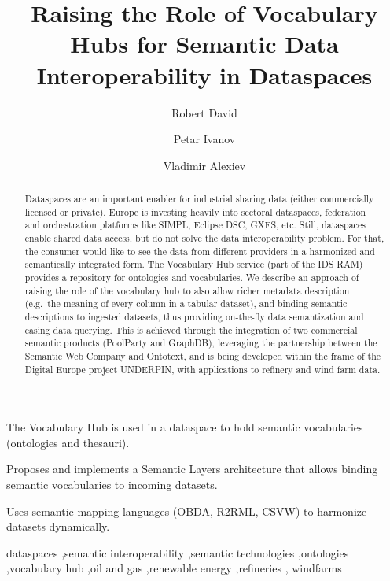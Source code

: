 \documentclass[
  super,
  preprint,
  3p]{elsarticle}
\begin{document}
\begin{frontmatter}
\title{Raising the Role of Vocabulary Hubs for Semantic Data
Interoperability in Dataspaces}
\author[1]{Robert David%
%
}
\author[2]{Petar Ivanov%
%
}
\author[2]{Vladimir Alexiev%
%
}





        
\begin{abstract}
Dataspaces are an important enabler for industrial sharing data (either
commercially licensed or private). Europe is investing heavily into
sectoral dataspaces, federation and orchestration platforms like SIMPL,
Eclipse DSC, GXFS, etc. Still, dataspaces enable shared data access, but
do not solve the data interoperability problem. For that, the consumer
would like to see the data from different providers in a harmonized and
semantically integrated form. The Vocabulary Hub service (part of the
IDS RAM) provides a repository for ontologies and vocabularies. We
describe an approach of raising the role of the vocabulary hub to also
allow richer metadata description (e.g.~the meaning of every column in a
tabular dataset), and binding semantic descriptions to ingested
datasets, thus providing on-the-fly data semantization and easing data
querying. This is achieved through the integration of two commercial
semantic products (PoolParty and GraphDB), leveraging the partnership
between the Semantic Web Company and Ontotext, and is being developed
within the frame of the Digital Europe project UNDERPIN, with
applications to refinery and wind farm data.
\end{abstract}



\begin{highlights}
\item The Vocabulary Hub is used in a dataspace to hold semantic
vocabularies (ontologies and thesauri).\item Proposes and implements a
Semantic Layers architecture that allows binding semantic vocabularies
to incoming datasets.\item Uses semantic mapping languages (OBDA, R2RML,
CSVW) to harmonize datasets dynamically.
\end{highlights}


\begin{keyword}
    dataspaces \sep semantic interoperability \sep semantic
technologies \sep ontologies \sep vocabulary hub \sep oil and
gas \sep renewable energy \sep refineries \sep 
    windfarms
\end{keyword}
\end{frontmatter}
    
\end{document}

